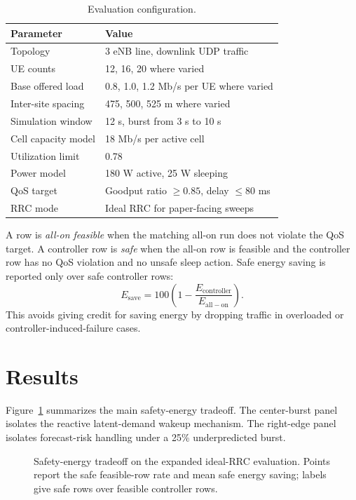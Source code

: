 \documentclass[10pt,twocolumn]{article}
\begin{document}
\begin{table}[H]
\centering
\caption{Evaluation configuration.}
\label{tab:setup}
\small
\begin{tabular}{@{}p{}p{}@{}}
\toprule
Parameter & Value \\
\midrule
Topology & 3 eNB line, downlink UDP traffic \\
UE counts & 12, 16, 20 where varied \\
Base offered load & 0.8, 1.0, 1.2 Mb/s per UE where varied \\
Inter-site spacing & 475, 500, 525 m where varied \\
Simulation window & 12 s, burst from 3 s to 10 s \\
Cell capacity model & 18 Mb/s per active cell \\
Utilization limit & 0.78 \\
Power model & 180 W active, 25 W sleeping \\
QoS target & Goodput ratio $\geq 0.85$, delay $\leq 80$ ms \\
RRC mode & Ideal RRC for paper-facing sweeps \\
\bottomrule
\end{tabular}
\end{table}

A row is \emph{all-on feasible} when the matching all-on run does not violate
the QoS target.  A controller row is \emph{safe} when the all-on row is feasible
and the controller row has no QoS violation and no unsafe sleep action.  Safe
energy saving is reported only over safe controller rows:
\begin{equation}
  E_{\mathrm{save}} = 100\left(1-\frac{E_{\mathrm{controller}}}{E_{\mathrm{all-on}}}\right).
\end{equation}
This avoids giving credit for saving energy by dropping traffic in overloaded
or controller-induced-failure cases.

\section{Results}

Figure~\ref{fig:evaluation-tradeoff} summarizes the main safety-energy tradeoff.
The center-burst panel isolates the reactive latent-demand wakeup mechanism.
The right-edge panel isolates forecast-risk handling under a 25\%
underpredicted burst.

\begin{figure}[H]
\centering

\caption{Safety-energy tradeoff on the expanded ideal-RRC evaluation.  Points
report the safe feasible-row rate and mean safe energy saving; labels give safe
rows over feasible controller rows.}
\label{fig:evaluation-tradeoff}
\end{figure}
\end{document}
